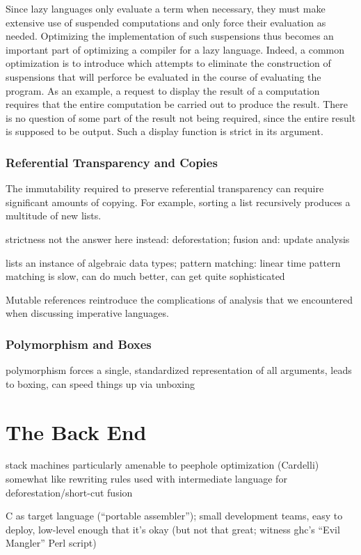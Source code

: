 Since lazy languages only evaluate a term when necessary, they must make extensive use of suspended computations and only force their evaluation as needed. Optimizing the implementation of such suspensions thus becomes an important part of optimizing a compiler for a lazy language. Indeed, a common optimization is to introduce  which attempts to eliminate the construction of suspensions that will perforce be evaluated in the course of evaluating the program. As an example, a request to display the result of a computation requires that the entire computation be carried out to produce the result. There is no question of some part of the result not being required, since the entire result is supposed to be output. Such a display function is strict in its argument.

\subsubsection{Referential Transparency and Copies}
The immutability required to preserve referential transparency can require significant amounts of copying. For example, sorting a list recursively produces a multitude of new lists.

strictness not the answer here
instead: deforestation; fusion
and: update analysis

lists an instance of algebraic data types; pattern matching: linear time pattern matching is slow, can do much better, can get quite sophisticated

Mutable references reintroduce the complications of analysis that we encountered when discussing imperative languages.

\subsubsection{Polymorphism and Boxes}
polymorphism forces a single, standardized representation of all arguments, leads to boxing, can speed things up via unboxing


\section{The Back End}
stack machines particularly amenable to peephole optimization (Cardelli)
somewhat like rewriting rules used with intermediate language for deforestation/short-cut fusion

C as target language (``portable assembler''); small development teams, easy to deploy, low-level enough that it's okay (but not that great; witness ghc's ``Evil Mangler'' Perl script)

